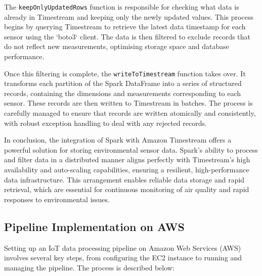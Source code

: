 \documentclass[12pt,oneside]{book} %
\begin{document}
The \texttt{keepOnlyUpdatedRows} function is responsible for checking what data
is already in Timestream and keeping only the newly updated values. This
process begins by querying Timestream to retrieve the latest data timestamp for
each sensor using the `boto3` client. The data is then filtered to exclude
records that do not reflect new measurements, optimising storage space and
database performance.

Once this filtering is complete, the \texttt{writeToTimestream} function takes
over. It transforms each partition of the Spark DataFrame into a series of
structured records, containing the dimensions and measurements corresponding to
each sensor. These records are then written to Timestream in batches. The
process is carefully managed to ensure that records are written atomically and
consistently, with robust exception handling to deal with any rejected records.

In conclusion, the integration of Spark with Amazon Timestream offers a
powerful solution for storing environmental sensor data. Spark's ability to
process and filter data in a distributed manner aligns perfectly with
Timestream's high availability and auto-scaling capabilities, ensuring a
resilient, high-performance data infrastructure. This arrangement enables
reliable data storage and rapid retrieval, which are essential for continuous
monitoring of air quality and rapid responses to environmental issues.

\newpage
\subsection{Pipeline Implementation on AWS}
Setting up an IoT data processing pipeline on Amazon Web Services (AWS)
involves several key steps, from configuring the EC2 instance to running and
managing the pipeline. The process is described below:
\end{document}
